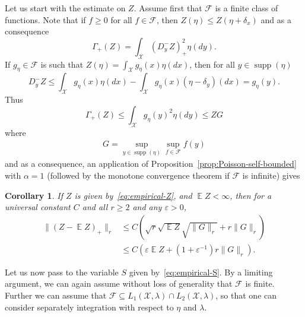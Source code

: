\documentclass[a4paper]{amsart}
\newtheorem{corollary}[theorem]{Corollary} %
\theoremstyle{definition}
\theoremstyle{remark}
\numberwithin{equation}{section}
\DeclareMathOperator{\EE}{\mathbb{E}} %
\DeclareMathOperator{\supp}{supp}
\begin{document}
Let us start with the estimate on $Z$. Assume first that $\mathcal{F}$ is a finite class of functions. Note that if $f\ge 0$ for all $f\in \mathcal{F}$, then $Z(\eta) \le Z(\eta+\delta_x)$ and as a consequence
\begin{displaymath}
  \Gamma_+(Z) = \int_\mathcal{X} (D_y^- Z)_+^2\eta(dy).
\end{displaymath}
If $g_\eta \in \mathcal{F}$ is such that $Z(\eta) = \int_\mathcal{X} g_\eta(x)\eta(dx)$, then for all $y \in \supp(\eta)$
\begin{displaymath}
  D_y^- Z \le  \int_\mathcal{X} g_\eta(x)\eta(dx) - \int_\mathcal{X} g_\eta(x)(\eta-\delta_y)(dx) = g_\eta(y).
\end{displaymath}
Thus
\begin{displaymath}
  \Gamma_+(Z) \le \int_\mathcal{X}  g_\eta(y)^2 \eta(dy) \le ZG
\end{displaymath}
where
\begin{align}\label{eq:def-G}
G = \sup_{y \in \supp(\eta)} \sup_{f\in\mathcal{F}} f(y)
\end{align}
and as a consequence, an application of Proposition~\ref{prop:Poisson-self-bounded} with $\alpha = 1$ (followed by the monotone convergence theorem if $\mathcal{F}$ is infinite) gives

\begin{corollary}
\label{cor:empirical-Z}
 If $Z$ is given by~\eqref{eq:empirical-Z}, and $\EE Z < \infty$, then for a universal constant $C$ and  all $r \ge 2$ and any $\varepsilon > 0$,
\begin{align*}
  \|(Z - \EE Z)_+\|_r &\le C(\sqrt{r}\sqrt{\EE Z}\sqrt{\|G\|_r} + r\|G\|_r)\\
  & \le C(\varepsilon\EE Z + (1+ \varepsilon^{-1})r\|G\|_r).
\end{align*}
\end{corollary}

Let us now pass to the variable $S$ given by~\eqref{eq:empirical-S}. By a limiting argument, we can again assume without loss of generality that $\mathcal{F}$ is finite. Further we can assume that $\mathcal{F} \subseteq L_1(\mathcal{X},\lambda)\cap L_2(\mathcal{X},\lambda)$, so that one can consider separately integration with respect to $\eta$ and $\lambda$.
\end{document}
